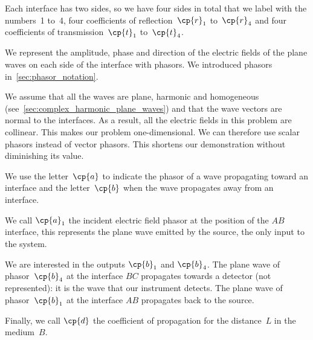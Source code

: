 \begin{refsection}
Each interface has two sides, so we have four sides in total that we label with the numbers~1 to~4,
four coefficients of reflection~$\cp{r}_1$ to~$\cp{r}_4$ and
four coefficients of transmission~$\cp{t}_1$ to~$\cp{t}_4$.

We represent the amplitude, phase and direction of the electric fields of the plane waves on each side of the interface with phasors.
We introduced phasors in~\cref{sec:phasor_notation}.

We assume that all the waves are plane, harmonic and homogeneous
(see~\cref{sec:complex_harmonic_plane_waves})
and that the wave vectors are normal to the interfaces.
As a result, all the electric fields in this problem are collinear.
This makes our problem one-dimensional.
We can therefore use scalar phasors instead of vector phasors.
This shortens our demonstration without diminishing its value.

We use the letter~$\cp{a}$ to indicate the phasor of a wave propagating toward an interface and the letter~$\cp{b}$ when the wave propagates away from an interface.

We call $\cp{a}_1$ the incident electric field phasor at the position of the $AB$ interface,
this represents the plane wave emitted by the source, the only input to the system.

We are interested in the outputs $\cp{b}_1$ and $\cp{b}_4$.
The plane wave of phasor~$\cp{b}_4$ at the interface $BC$ propagates towards a detector (not represented): it is the wave that our instrument detects.
The plane wave of phasor~$\cp{b}_1$ at the interface $AB$ propagates back to the source.

Finally, we call $\cp{d}$ the coefficient of propagation for the distance~$L$ in the medium~$B$.


\end{refsection}
